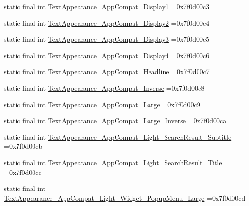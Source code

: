 \begin{DoxyCompactItemize}
\item 
static final int \mbox{\hyperlink{classcom_1_1example_1_1trainawearapplication_1_1_r_1_1style_a42ab96789103544fd1c353ac76cdf7cf}{Text\+Appearance\+\_\+\+App\+Compat\+\_\+\+Display1}} =0x7f0d00c3
\item 
static final int \mbox{\hyperlink{classcom_1_1example_1_1trainawearapplication_1_1_r_1_1style_a068a9e9eedf39b66360539f37f849424}{Text\+Appearance\+\_\+\+App\+Compat\+\_\+\+Display2}} =0x7f0d00c4
\item 
static final int \mbox{\hyperlink{classcom_1_1example_1_1trainawearapplication_1_1_r_1_1style_a49b4d2bd37c3013055f5ae83e0a6fda5}{Text\+Appearance\+\_\+\+App\+Compat\+\_\+\+Display3}} =0x7f0d00c5
\item 
static final int \mbox{\hyperlink{classcom_1_1example_1_1trainawearapplication_1_1_r_1_1style_a1e32cd78669706c05186ca9059f3f940}{Text\+Appearance\+\_\+\+App\+Compat\+\_\+\+Display4}} =0x7f0d00c6
\item 
static final int \mbox{\hyperlink{classcom_1_1example_1_1trainawearapplication_1_1_r_1_1style_a4f84f4a4864db0c8d037fa7b5c660217}{Text\+Appearance\+\_\+\+App\+Compat\+\_\+\+Headline}} =0x7f0d00c7
\item 
static final int \mbox{\hyperlink{classcom_1_1example_1_1trainawearapplication_1_1_r_1_1style_a7ce47dff0e4a586acd4dbbb1f3668e39}{Text\+Appearance\+\_\+\+App\+Compat\+\_\+\+Inverse}} =0x7f0d00c8
\item 
static final int \mbox{\hyperlink{classcom_1_1example_1_1trainawearapplication_1_1_r_1_1style_a75649238f6eac4fabdddd23534078eca}{Text\+Appearance\+\_\+\+App\+Compat\+\_\+\+Large}} =0x7f0d00c9
\item 
static final int \mbox{\hyperlink{classcom_1_1example_1_1trainawearapplication_1_1_r_1_1style_aebb27a3b17b0e2731066a1f6bd3a338c}{Text\+Appearance\+\_\+\+App\+Compat\+\_\+\+Large\+\_\+\+Inverse}} =0x7f0d00ca
\item 
static final int \mbox{\hyperlink{classcom_1_1example_1_1trainawearapplication_1_1_r_1_1style_a7e9aa744991059707fd6fa829297e7cf}{Text\+Appearance\+\_\+\+App\+Compat\+\_\+\+Light\+\_\+\+Search\+Result\+\_\+\+Subtitle}} =0x7f0d00cb
\item 
static final int \mbox{\hyperlink{classcom_1_1example_1_1trainawearapplication_1_1_r_1_1style_a5f4210b8d7f5a4b31320a216383b6b5b}{Text\+Appearance\+\_\+\+App\+Compat\+\_\+\+Light\+\_\+\+Search\+Result\+\_\+\+Title}} =0x7f0d00cc
\item 
static final int \mbox{\hyperlink{classcom_1_1example_1_1trainawearapplication_1_1_r_1_1style_a5d05ddc7fb30d9677ffffaba3e9844d0}{Text\+Appearance\+\_\+\+App\+Compat\+\_\+\+Light\+\_\+\+Widget\+\_\+\+Popup\+Menu\+\_\+\+Large}} =0x7f0d00cd

\end{DoxyCompactItemize}
